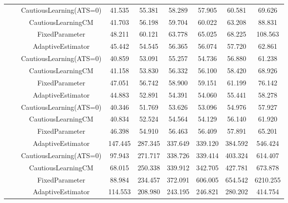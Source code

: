 \begin{table}[!h]
\begin{tabular}[t]{ccccccccc}
 &  & CautiousLearning(ATS=0) & 41.535 & 55.381 & 58.289 & 57.905 & 60.581 & 69.626\\

 &  & CautiousLearningCM & 41.703 & 56.198 & 59.704 & 60.022 & 63.208 & 88.831\\

 & \multirow[t]{-4}{*}{\centering\arraybackslash 1.00} & FixedParameter & 48.211 & 60.121 & 63.778 & 65.025 & 68.225 & 108.563\\
\cmidrule{2-9}
 &  & AdaptiveEstimator & 45.442 & 54.545 & 56.365 & 56.074 & 57.720 & 62.861\\

 &  & CautiousLearning(ATS=0) & 40.859 & 53.091 & 55.257 & 54.736 & 56.880 & 61.238\\

 &  & CautiousLearningCM & 41.158 & 53.830 & 56.332 & 56.100 & 58.420 & 68.926\\

 & \multirow[t]{-4}{*}{\centering\arraybackslash 1.25} & FixedParameter & 47.051 & 56.742 & 58.900 & 59.151 & 61.199 & 76.142\\
\cmidrule{2-9}
 &  & AdaptiveEstimator & 44.883 & 52.891 & 54.391 & 54.060 & 55.441 & 58.278\\

 &  & CautiousLearning(ATS=0) & 40.346 & 51.769 & 53.626 & 53.096 & 54.976 & 57.927\\

 &  & CautiousLearningCM & 40.834 & 52.524 & 54.564 & 54.129 & 56.140 & 61.920\\

\multirow[t]{-28}{*}{\centering\arraybackslash 50} & \multirow[t]{-4}{*}{\centering\arraybackslash 1.50} & FixedParameter & 46.398 & 54.910 & 56.463 & 56.409 & 57.891 & 65.201\\
\cmidrule{1-9}
 &  & AdaptiveEstimator & 147.445 & 287.345 & 337.649 & 339.120 & 384.592 & 546.424\\

 &  & CautiousLearning(ATS=0) & 97.943 & 271.717 & 338.726 & 339.414 & 403.324 & 614.407\\

 &  & CautiousLearningCM & 68.015 & 250.338 & 339.912 & 342.705 & 427.781 & 673.878\\

 & \multirow[t]{-4}{*}{\centering\arraybackslash 0.25} & FixedParameter & 88.984 & 234.457 & 372.091 & 606.005 & 654.542 & 6210.255\\
\cmidrule{2-9}
 &  & AdaptiveEstimator & 114.553 & 208.980 & 243.195 & 246.821 & 280.202 & 414.754\\


\end{tabular}
\end{table}
